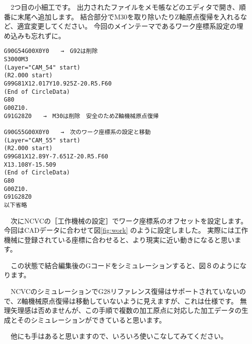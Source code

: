 

\vspace*{1zh}
　2つ目の小細工です。
出力されたファイルをメモ帳などのエディタで開き、順番に末尾へ追加します。
結合部分でM30を取り除いたりZ軸原点復帰を入れるなど、適宜変更してください。
今回のメインテーマであるワーク座標系設定の埋め込みも忘れずに。

\begin{lstlisting}[caption=編集後のNCプログラム,numbers=none,label=lst:gcode.txt]
%
G90G54G00X0Y0　　→　G92は削除
S3000M3
(Layer="CAM_54" start)
(R2.000 start)
G99G81X12.017Y10.925Z-20.R5.F60
(End of CircleData)
G80
G00Z10.
G91G28Z0　　→　M30は削除　安全のためZ軸機械原点復帰

G90G55G00X0Y0　　→　次のワーク座標系の設定と移動
(Layer="CAM_55" start)
(R2.000 start)
G99G81X12.89Y-7.651Z-20.R5.F60
X13.108Y-15.509
(End of CircleData)
G80
G00Z10.
G91G28Z0
以下省略
\end{lstlisting}

　次にNCVCの［工作機械の設定］でワーク座標系のオフセットを設定します。
今回はCADデータに合わせて図\ref{fig:work} のように設定しました。
実際には工作機械に登録されている座標に合わせると、より現実に近い動きになると思います。


　この状態で結合編集後のGコードをシミュレーションすると、図８のようになります。


　NCVCのシミュレーションでG28リファレンス復帰はサポートされていないので、Z軸機械原点復帰は移動していないように見えますが、これは仕様です。
無理矢理感は否めませんが、この手順で複数の加工原点に対応した加工データの生成とそのシミュレーションができていると思います。

　他にも手はあると思いますので、いろいろ使いこなしてみてください。
